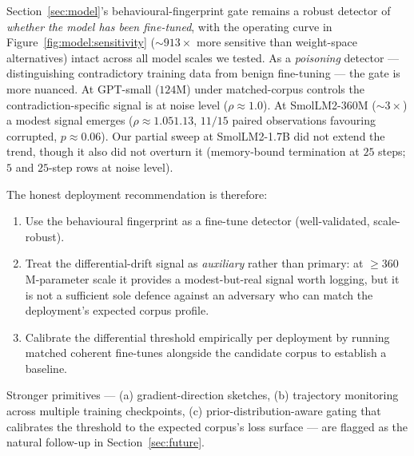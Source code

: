 \documentclass[11pt,a4paper]{article}
\begin{document}
Section~\ref{sec:model}'s behavioural\nobreakdash-fingerprint gate
remains a robust detector of \emph{whether the model has been
fine\nobreakdash-tuned}, with the operating curve in
Figure~\ref{fig:model:sensitivity}
($\sim\!9$\textendash$13\!\times$ more sensitive than
weight\nobreakdash-space alternatives) intact across all model
scales we tested.  As a \emph{poisoning} detector — distinguishing
contradictory training data from benign fine\nobreakdash-tuning —
the gate is more nuanced.  At GPT\nobreakdash-small
($124$M) under matched\nobreakdash-corpus controls the
contradiction\nobreakdash-specific signal is at noise level
($\rho \approx 1.0$).  At SmolLM2\nobreakdash-360M
($\sim\!3\!\times$) a modest signal emerges
($\rho \approx 1.05$\textendash$1.13$, $11/15$ paired observations
favouring corrupted, $p \approx 0.06$).  Our partial sweep at
SmolLM2\nobreakdash-1.7B did not extend the trend, though it
also did not overturn it (memory\nobreakdash-bound termination at
$25$ steps; $5$ and $25$\nobreakdash-step rows at noise level).

The honest deployment recommendation is therefore:

\begin{enumerate}
  \item Use the behavioural fingerprint as a fine\nobreakdash-tune
        detector (well\nobreakdash-validated, scale\nobreakdash-robust).
  \item Treat the differential\nobreakdash-drift signal as
        \emph{auxiliary} rather than primary: at $\geq\!360$M\nobreakdash-parameter
        scale it provides a modest\nobreakdash-but\nobreakdash-real
        signal worth logging, but it is not a sufficient sole
        defence against an adversary who can match the
        deployment's expected corpus profile.
  \item Calibrate the differential threshold empirically per
        deployment by running matched coherent fine\nobreakdash-tunes
        alongside the candidate corpus to establish a baseline.
\end{enumerate}

Stronger primitives — (a) gradient\nobreakdash-direction sketches,
(b) trajectory monitoring across multiple training checkpoints,
(c) prior\nobreakdash-distribution\nobreakdash-aware gating that
calibrates the threshold to the expected corpus's loss surface
— are flagged as the natural follow\nobreakdash-up in
Section~\ref{sec:future}.
\end{document}
